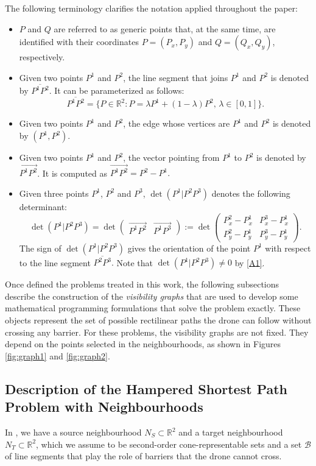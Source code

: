 \documentclass[a4paper,  review, authoryear, 1p.]{elsarticle}
\newcommand{\SPPN}{{\sf{H-SPPN}\xspace }}
\newcommand{\JP}[1]{{\color{armygreen}#1}}
\newcommand{\CV}[1]{{\color{red}#1}}
\newcommand{\segment}[2]{\overline{#1#2}}
\newcommand{\determinant}[3]{\det({#1|#2#3})}
\begin{document}
	The following terminology clarifies the notation applied throughout the paper: 
	\begin{itemize}
		\item $P$ and $Q$ are referred to as generic points that, at the same time, are identified with their coordinates $P=(P_x, P_y)$ and $Q=(Q_x, Q_y)$, respectively.
		\item Given two points $P^1$ and $P^2$, the line segment that joins $P^1$ and $P^2$ is denoted by $\segment{P^1}{P^2}$. It can be parameterized as follows:
		$$\segment{P^1}{P^2}=\{P\in\mathbb R^2:P=\lambda P^1 + (1-\lambda)P^2,\,\lambda\in[0,1]\}.$$
		\item  Given two points $P^1$ and $P^2$, the edge whose vertices are $P^1$ and $P^2$ is denoted by $(P^1, P^2)$.
		\item  Given two points $P^1$ and $P^2$, the vector pointing from $P^1$ to $P^2$ is denoted by $\overrightarrow{P^1P^2}$. It is computed as
		$\overrightarrow{P^1P^2}=P^2-P^1.$
		\item Given three points $P^1$, $P^2$ and $P^3$, $\determinant{P^1}{P^2}{P^3}$ denotes the following determinant:
		$$
		\determinant{P^1}{P^2}{P^3}=\det\left(\begin{array}{c|c} \overrightarrow{P^1P^2} & \overrightarrow{P^1P^3}\end{array}\right):=\det\left( \begin{array}{cc}  P^2_x-P^1_x & P^3_x-P^1_x \\ P_y^2-P^1_y & P_y^3-P_y^1 \end{array}\right).
		$$
		The sign of $\determinant{P^1}{P^2}{P^3}$ gives the orientation of the point $P^1$ with respect to the line segment $\segment{P^2}{P^3}.$ Note that $\determinant{P^1}{P^2}{P^3}\neq 0$ by \ref{A1}. 
	\end{itemize}
	
	\CV{Once defined the problems treated in this work, the following subsections describe the construction of the \emph{visibility graphs} that are used to develop some mathematical programming formulations that solve the problem exactly. These objects represent the set of possible rectilinear paths the drone can \JP{follow} without crossing any barrier. For these problems, the visibility graphs are not fixed. They depend on the points selected in the neighbourhoods, as shown in Figures \ref{fig:graph1} and \ref{fig:graph2}}.
	
		
	\subsection{Description of the Hampered Shortest Path Problem with Neighbourhoods}\label{subsection:descriptionHSPPN}
	In \SPPN, we have a source neighbourhood $N_S\subset\mathbb R^2$ and a target neighbourhood $N_T\subset\mathbb R^2$, which we assume to be second-order cone-representable sets and a set $\mathcal B$ of line segments that play the role of barriers that the drone cannot cross. 
	
\end{document}
